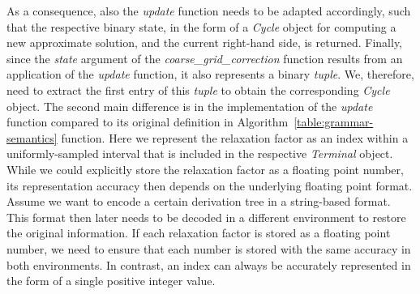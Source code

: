As a consequence, also the \emph{update} function needs to be adapted accordingly, such that the respective binary state, in the form of a \emph{Cycle} object for computing a new approximate solution, and the current right-hand side, is returned.
Finally, since the \emph{state} argument of the \emph{coarse\_grid\_correction} function results from an application of the \emph{update} function, it also represents a binary \emph{tuple}.
We, therefore, need to extract the first entry of this \emph{tuple} to obtain the corresponding \emph{Cycle} object.
The second main difference is in the implementation of the \emph{update} function compared to its original definition in Algorithm~\ref{table:grammar-semantics} function.
Here we represent the relaxation factor as an index within a uniformly-sampled interval that is included in the respective \emph{Terminal} object.
While we could explicitly store the relaxation factor as a floating point number, its representation accuracy then depends on the underlying floating point format.
Assume we want to encode a certain derivation tree in a string-based format.
This format then later needs to be decoded in a different environment to restore the original information.
If each relaxation factor is stored as a floating point number, we need to ensure that each number is stored with the same accuracy in both environments.
In contrast, an index can always be accurately represented in the form of a single positive integer value.

